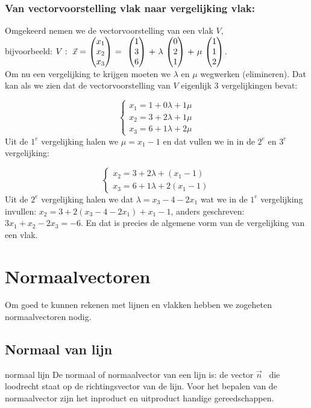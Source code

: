 \subsubsection{Van vectorvoorstelling vlak naar vergelijking vlak:}
Omgekeerd nemen we de vectorvoorstelling van een vlak $ V $,\\ 
bijvoorbeeld:
$ V: \  \vec{x} =\  \vecdriesnel{x} \ = \  \ \vecdrie{1}{3}{6} \ + \ \lambda \ \vecdrie{0}{2}{1} \ + \ \mu \ \vecdrie{1}{1}{2} $.\\
Om nu een vergelijking te krijgen moeten we $ \lambda $  en $ \mu $ wegwerken (elimineren). Dat kan als we zien dat de vectorvoorstelling van $ V $ eigenlijk 3 vergelijkingen bevat:

\[\begin{cases}
x_1 =  1 + 0\lambda + 1\mu\\
x_2 =  3 + 2\lambda  + 1\mu\\
x_3 = 6 + 1 \lambda + 2\mu  
\end{cases}
\] 
Uit de $ 1^{e}$ vergelijking halen we $ \mu = x_1 -1 $ en dat vullen we in in de $ 2^{e}$ en $ 3^{e}$ vergelijking:

\[\begin{cases}
x_2 =  3 + 2\lambda  + ( x_1 -1)\\
x_3 = 6 + 1 \lambda + 2( x_1 -1)
\end{cases}
\] 
Uit de $ 2^{e}$ vergelijking halen we dat $ \lambda = x_3 - 4 - 2x_1 $ wat we in de $ 1^{e}$ vergelijking invullen:
$ x_2 = 3 + 2(x_3 -4 -2x_1) + x_1 - 1$, anders geschreven: $ 3x_1 +x_2 - 2x_3 = -6
$. En dat is precies de algemene vorm van de vergelijking van een vlak.


\section{Normaalvectoren}
Om goed te kunnen rekenen met lijnen en vlakken hebben we zogeheten normaalvectoren nodig.

\subsection{Normaal van lijn}
\mydef
{normaal lijn}
{De normaal of normaalvector van een lijn is: 
	de vector $ \vec{n} $  \ die loodrecht staat op de richtingsvector van de lijn.} Voor het bepalen van de normaalvector zijn het inproduct en uitproduct handige gereedschappen. \\

